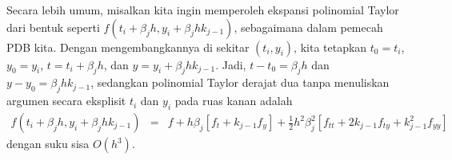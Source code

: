 Secara lebih umum, misalkan kita ingin memperoleh ekspansi polinomial
Taylor dari bentuk seperti $f(t_{i}+\beta_{j}h,y_{i}+\beta_{j}hk_{j-1})$,
sebagaimana dalam pemecah PDB kita. Dengan mengembangkannya di sekitar
$(t_{i},y_{i})$, kita tetapkan $t_{0}=t_{i}$, $y_{0}=y_{i}$, $t=t_{i}+\beta_{j}h$,
dan $y=y_{i}+\beta_{j}hk_{j-1}$. Jadi, $t-t_{0}=\beta_{j}h$ dan
$y-y_{0}=\beta_{j}hk_{j-1}$, sedangkan polinomial Taylor derajat
dua tanpa menuliskan argumen secara eksplisit $t_{i}$ dan $y_{i}$
pada ruas kanan adalah 
\begin{eqnarray*}
f(t_{i}+\beta_{j}h,y_{i}+\beta_{j}hk_{j-1}) & = & f+h\beta_{j}\left[f_{t}+k_{j-1}f_{y}\right]+\frac{1}{2}h^{2}\beta_{j}^{2}\left[f_{tt}+2k_{j-1}f_{ty}+k_{j-1}^{2}f_{yy}\right]
\end{eqnarray*}
dengan suku sisa $O(h^{3})$. 

